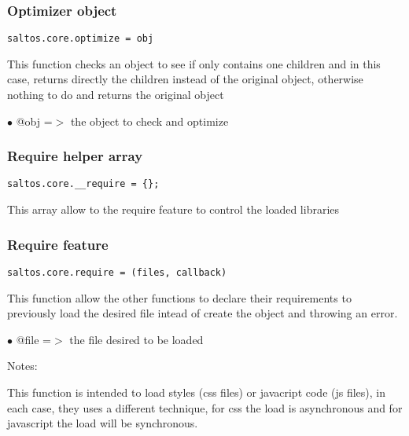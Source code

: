 \documentclass[a4paper]{article}
\begin{document}
\hypertarget{toc706}{}
\subsubsection{Optimizer object}

\begin{lstlisting}
saltos.core.optimize = obj
\end{lstlisting}

This function checks an object to see if only contains one children and in this case, returns
directly the children instead of the original object, otherwise nothing to do and returns the
original object

\begin{compactitem}
\item[\color{myblue}$\bullet$] @obj =$>$ the object to check and optimize
\end{compactitem}

\hypertarget{toc707}{}
\subsubsection{Require helper array}

\begin{lstlisting}
saltos.core.__require = {};
\end{lstlisting}

This array allow to the require feature to control the loaded libraries

\hypertarget{toc708}{}
\subsubsection{Require feature}

\begin{lstlisting}
saltos.core.require = (files, callback)
\end{lstlisting}

This function allow the other functions to declare their requirements to previously load the
desired file intead of create the object and throwing an error.

\begin{compactitem}
\item[\color{myblue}$\bullet$] @file =$>$ the file desired to be loaded
\end{compactitem}

Notes:

This function is intended to load styles (css files) or javacript code (js files), in each
case, they uses a different technique, for css the load is asynchronous and for javascript
the load will be synchronous.
\end{document}

